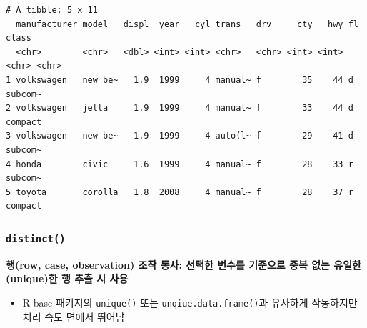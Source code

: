 \documentclass[
  11pt,
]{krantz}
\makeatletter
\newenvironment{Shaded}{\begin{snugshade}}{\end{snugshade}}
\newcommand{\CommentTok}[1]{\textcolor[rgb]{0.37,0.37,0.37}{\textit{#1}}}
\newcommand{\DecValTok}[1]{\textcolor[rgb]{0.06,0.06,0.06}{#1}}
\newcommand{\KeywordTok}[1]{\textcolor[rgb]{0.27,0.27,0.27}{\textbf{#1}}}
\newcommand{\NormalTok}[1]{#1}
\newcommand{\OperatorTok}[1]{\textcolor[rgb]{0.43,0.43,0.43}{\textbf{#1}}}
\newcommand{\StringTok}[1]{\textcolor[rgb]{0.5,0.5,0.5}{#1}}
\providecommand{\tightlist}{%
  \setlength{\itemsep}{0pt}\setlength{\parskip}{0pt}}
\newenvironment{kframe}{%
\medskip{}
\setlength{\fboxsep}{.8em}
 \def\at@end@of@kframe{}%
 \ifinner\ifhmode%
  \def\at@end@of@kframe{\end{minipage}}%
  \begin{minipage}{\columnwidth}%
 \fi\fi%
 \def\FrameCommand##1{\hskip\@totalleftmargin \hskip-\fboxsep
 \colorbox{shadecolor}{##1}\hskip-\fboxsep
     \hskip-\linewidth \hskip-\@totalleftmargin \hskip\columnwidth}%
 \MakeFramed {\advance\hsize-\width
   \@totalleftmargin\z@ \linewidth\hsize
   \@setminipage}}%
 {\par\unskip\endMakeFramed%
 \at@end@of@kframe}
\renewenvironment{quote}{\begin{kframe}}{\end{kframe}}
\makeatother
\begin{document}
\begin{Shaded}
\end{Shaded}

\begin{verbatim}
# A tibble: 5 x 11
  manufacturer model   displ  year   cyl trans   drv     cty   hwy fl    class  
  <chr>        <chr>   <dbl> <int> <int> <chr>   <chr> <int> <int> <chr> <chr>  
1 volkswagen   new be~   1.9  1999     4 manual~ f        35    44 d     subcom~
2 volkswagen   jetta     1.9  1999     4 manual~ f        33    44 d     compact
3 volkswagen   new be~   1.9  1999     4 auto(l~ f        29    41 d     subcom~
4 honda        civic     1.6  1999     4 manual~ f        28    33 r     subcom~
5 toyota       corolla   1.8  2008     4 manual~ f        28    37 r     compact
\end{verbatim}

\normalsize

\hypertarget{dplyr-distinct}{%
\subsubsection*{\texorpdfstring{\texttt{distinct()}}{distinct()}}\label{dplyr-distinct}}


\begin{quote}
\textbf{행(row, case, observation) 조작 동사: 선택한 변수를 기준으로 중복 없는 유일한(unique)한 행 추출 시 사용}
\end{quote}

\begin{itemize}
\tightlist
\item
  R base 패키지의 \texttt{unique()} 또는 \texttt{unqiue.data.frame()}과 유사하게 작동하지만 처리 속도 면에서 뛰어남
\end{itemize}

\footnotesize

\begin{Shaded}
\end{Shaded}
\end{document}
